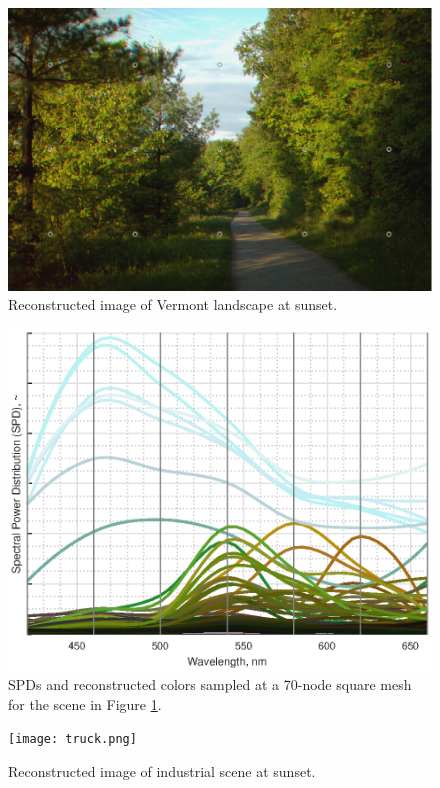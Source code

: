 \documentclass[twocolumn,10pt]{asme2ej}
\begin{document}
\begin{figure}[H]
\begin{centering}
  \includegraphics[height=0.55\linewidth]{vermont_path.png}
  \caption{Reconstructed image of Vermont landscape at sunset.}
  \label{path_mesh}
  \end{centering}
\end{figure}

\begin{figure}[H]
\begin{centering}
  \includegraphics[height=0.6\linewidth]{vermont_path.eps}
  \caption{SPDs and reconstructed colors sampled at a 70-node square mesh for the scene in Figure \ref{path_mesh}.}
  \label{path_SPDs}
  \end{centering}
\end{figure}

\clearpage

\begin{figure}[H]
\begin{centering}
  \texttt{[image: truck.png]}
  \caption{Reconstructed image of industrial scene at sunset.}
  \label{truck_mesh}
  \end{centering}
\end{figure}
\end{document}
